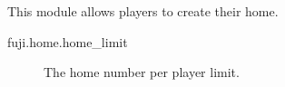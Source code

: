 
This module allows players to create their home.


\begin{description}
    \item [fuji.home.home\_limit] The home number per player limit.
\end{description}

